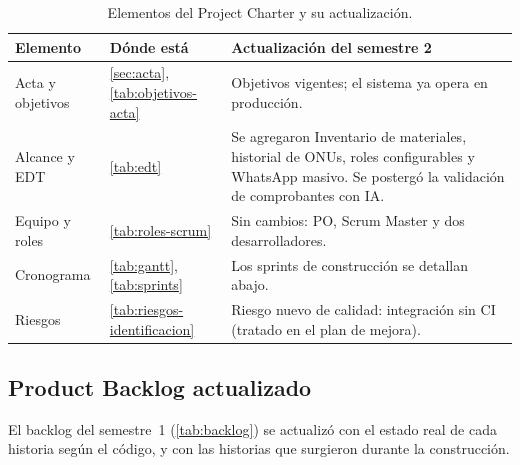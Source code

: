 \begin{table}[H]
\centering
\caption{Elementos del Project Charter y su actualización.}
\label{tab:ce02-e4-charter}
\small
\begin{tabularx}{\textwidth}{L{2.6cm}L{2.8cm}X}
\toprule
\textbf{Elemento} & \textbf{Dónde está} & \textbf{Actualización del semestre 2} \\
\midrule
Acta y objetivos & \cref{sec:acta}, \cref{tab:objetivos-acta} & Objetivos vigentes; el sistema ya opera en producción. \\
Alcance y EDT & \cref{tab:edt} & Se agregaron Inventario de materiales, historial de ONUs, roles configurables y WhatsApp masivo. Se postergó la validación de comprobantes con IA. \\
Equipo y roles & \cref{tab:roles-scrum} & Sin cambios: PO, Scrum Master y dos desarrolladores. \\
Cronograma & \cref{tab:gantt}, \cref{tab:sprints} & Los sprints de construcción se detallan abajo. \\
Riesgos & \cref{tab:riesgos-identificacion} & Riesgo nuevo de calidad: integración sin CI (tratado en el plan de mejora). \\
\bottomrule
\end{tabularx}
\end{table}

\subsection{Product Backlog actualizado}

El backlog del semestre~1 (\cref{tab:backlog}) se actualizó con el estado real de cada historia
según el código, y con las historias que surgieron durante la construcción.

